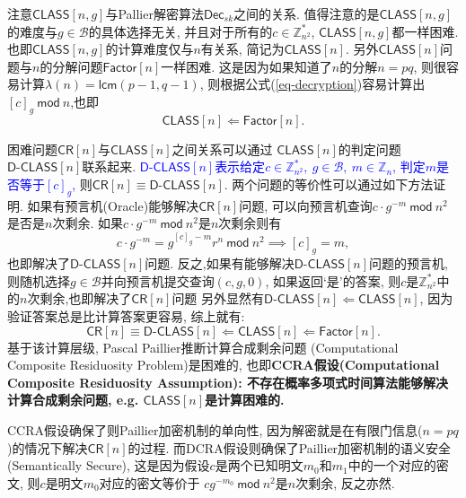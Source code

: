 \documentclass{article}
\newcommand{\Z}{\mathbb{Z}}
\newcommand{\blue}{\textcolor{blue}}
\begin{document}
注意$\textsf{CLASS}[n, g]$与Pallier解密算法$\textsf{Dec}_{sk}$之间的关系.
值得注意的是$\textsf{CLASS}[n, g]$的难度与$g\in\mathcal{B}$的具体选择无关,
并且对于所有的$c\in\Z_{n^2}^*$, $\textsf{CLASS}[n, g]$都一样困难.
也即$\textsf{CLASS}[n, g]$的计算难度仅与$n$有关系, 简记为$\textsf{CLASS}[n]$.
另外$\textsf{CLASS}[n]$问题与$n$的分解问题$\textsf{Factor}[n]$一样困难.
这是因为如果知道了$n$的分解$n = pq$, 则很容易计算$\lambda(n) = \textsf{lcm}(p-1, q-1)$,
则根据公式(\ref{eq-decryption})容易计算出 $[c]_g ~\textsf{mod}~ n$,也即
$$
\textsf{CLASS}[n] \Leftarrow \textsf{Factor}[n].
$$

困难问题$\textsf{CR}[n]$与$\textsf{CLASS}[n]$之间关系可以通过
$\textsf{CLASS}[n]$的判定问题$\textsf{D-CLASS}[n]$联系起来.
\blue{$\textsf{D-CLASS}[n]$表示给定$c\in\Z_{n^2}^*,\ g\in\mathcal{B},\  m\in\Z_n$,
判定$m$是否等于$[c]_g$, }则$\textsf{CR}[n]\equiv\textsf{D-CLASS}[n]$.
两个问题的等价性可以通过如下方法证明.
如果有预言机(Oracle)能够解决$\textsf{CR}[n]$问题,
可以向预言机查询$c\cdot g^{-m}~\textsf{mod}~n^2$是否是$n$次剩余.
如果$c\cdot g^{-m}~\textsf{mod}~n^2$是$n$次剩余则有
$$
c\cdot g^{-m} = g^{[c]_g-m}r^{n}~\textsf{mod}~n^2\implies [c]_g = m,
$$
也即解决了$\textsf{D-CLASS}[n]$问题.
反之,如果有能够解决$\textsf{D-CLASS}[n]$问题的预言机, 
则随机选择$g\in\mathcal{B}$并向预言机提交查询$(c,g,0)$,
如果返回`是'的答案, 则$c$是$\Z_{n^2}^*$中的$n$次剩余,也即解决了$\textsf{CR}[n]$问题
另外显然有$\textsf{D-CLASS}[n]\Leftarrow\textsf{CLASS}[n]$, 
因为验证答案总是比计算答案更容易, 综上就有:
$$
\textsf{CR}[n] \equiv \textsf{D-CLASS}[n] \Leftarrow \textsf{CLASS}[n] \Leftarrow \textsf{Factor}[n].
$$
基于该计算层级, Pascal Paillier推断计算合成剩余问题
(Computational Composite Residuosity Problem)是困难的,
也即\textbf{CCRA假设(Computational Composite Residuosity Assumption): 
不存在概率多项式时间算法能够解决计算合成剩余问题, e.g. $\textsf{CLASS}[n]$是计算困难的.}

CCRA假设确保了则Paillier加密机制的单向性, 
因为解密就是在有限门信息($n=pq$)的情况下解决$\textsf{CR}[n]$的过程.
而DCRA假设则确保了Paillier加密机制的语义安全(Semantically Secure),
这是因为假设$c$是两个已知明文$m_0$和$m_1$中的一个对应的密文,
则$c$是明文$m_0$对应的密文等价于
$cg^{-m_0}~\textsf{mod}~n^2$是$n$次剩余, 反之亦然.
\end{document}
